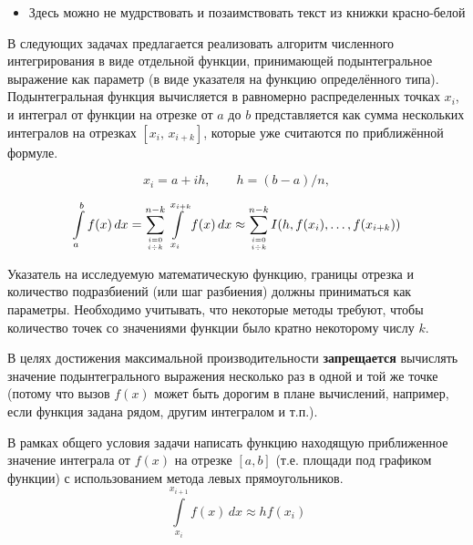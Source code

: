 \begin{itemize}
    \item Здесь можно не мудрствовать и позаимствовать текст из книжки красно-белой
\end{itemize}
В следующих задачах предлагается реализовать алгоритм численного 
интегрирования в виде отдельной функции, принимающей подынтегральное выражение
как параметр (в виде указателя на функцию определённого типа). Подынтегральная 
функция вычисляется в равномерно распределенных точках $x_i$, и интеграл от 
функции на отрезке от $a$ до $b$ представляется как сумма нескольких интегралов 
на отрезках $[x_i,\, x_{i+k}]$, которые уже считаются по приближённой формуле.

\[ x_i = a + i h,\qquad h = (b-a)/n, \]

\[ 
\int\limits_a^b f(x)\,dx = 
\sum_{{i=0} \above 0pt {i\div k}}^{n-k} \int\limits_{x_i}^{x_{i+k}} f(x)\,dx \approx
\sum_{{i=0} \above 0pt {i\div k}}^{n-k} I(h, f(x_i),\dots, f(x_{i+k}))
\]

Указатель на исследуемую математическую функцию, границы отрезка и количество
подразбиений (или шаг разбиения) должны приниматься как параметры. Необходимо 
учитывать, что некоторые методы требуют, чтобы количество точек со значениями 
функции было кратно некоторому числу $k$.

В целях достижения максимальной производительности \textbf{запрещается} вычислять
значение подынтегрального выражения несколько раз в одной и той же точке (потому 
что вызов $f(x)$ может быть дорогим в плане вычислений, например, если функция 
задана рядом, другим интегралом и т.п.).


\begin{zztask}
В рамках общего условия задачи написать функцию находящую приближенное значение 
интеграла от $f(x)$ на отрезке $[a, b]$ (т.е. площади под графиком функции)
с использованием метода левых прямоугольников. 
\[
\int\limits_{x_i}^{x_{i+1}} f(x)\,dx \approx h f(x_i)
\]
\end{zztask}

